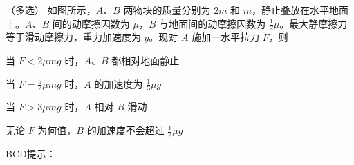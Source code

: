 （多选）
如图所示，\(A\)、\(B\) 两物块的质量分别为 \(2m\) 和 \(m\)，静止叠放在水平地面上。\(A\)、\(B\) 间的动摩擦因数为 \(\mu\)，\(B\) 与地面间的动摩擦因数为 \(\frac{1}{2}\mu\)。最大静摩擦力等于滑动摩擦力，重力加速度为 \(g\)。现对 \(A\) 施加一水平拉力 \(F\)，则\paren[]

\begin{choices}
	\item 当 \(F < 2\mu mg\) 时，\(A\)、\(B\) 都相对地面静止
	\item 当 \(F = \frac{5}{2}\mu mg\) 时，\(A\) 的加速度为 \(\frac{1}{3}\mu g\)
	\item 当 \(F > 3\mu mg\) 时，\(A\) 相对 \(B\) 滑动
	\item 无论 \(F\) 为何值，\(B\) 的加速度不会超过 \(\frac{1}{2}\mu g\)
\end{choices}
\begin{answer}
	BCD\qquad 提示：
\end{answer}